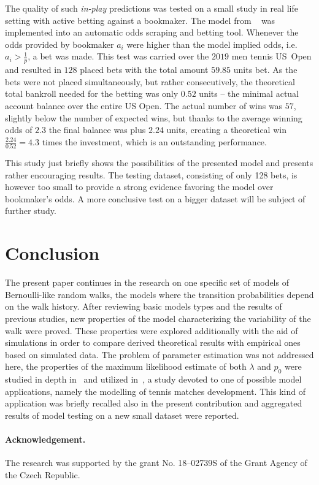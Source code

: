 \documentclass[runningheads]{CMSIM}
\begin{document}
    The quality of such \emph{in-play} predictions was tested on a small study in real life setting with active betting against a bookmaker.
    The model from ~\cite{ja2019mathsport_proc} was implemented into an automatic odds scraping and betting tool.
    Whenever the odds provided by bookmaker $a_{i}$  were higher than the model implied odds, i.e. $a_{i}>\frac{1}{p}$, a bet was made.
    This test was carried over the $2019$ men tennis US~Open and resulted in $128$ placed bets with the total amount $59.85$ units bet.
    As the bets were not placed simultaneously, but rather consecutively, the theoretical total bankroll needed for the betting was only $0.52$ units -- the minimal actual account balance over the entire US Open.
    The actual number of wins was $57$, slightly below the number of expected wins, but thanks to the average winning odds of $2.3$ the final balance was plus $2.24$ units,
    creating a theoretical win $\frac{2.24}{0.52}=4.3$ times the investment, which is an outstanding performance.

    This study just briefly shows the possibilities of the presented model and presents rather encouraging results.
    The testing dataset, consisting of only 128 bets, is however too small to provide a strong evidence favoring the model over bookmaker's odds.
    A more conclusive test on a bigger dataset will be subject of further study.


    \section{Conclusion}\label{sec:conclusion}

    The present paper continues in the research on one specific set of
    models of Bernoulli-like random walks, the models where the transition
    probabilities depend on the walk history.
    After reviewing basic models
    types and the results of previous studies, new
    properties of the model characterizing the variability of the walk were proved.
    These properties were explored additionally with the aid
    of simulations in order to compare derived theoretical results with
    empirical ones based on simulated data.
    The problem of parameter
    estimation was not addressed here, the properties of the maximum likelihood
    estimate of both $\lambda$ and $p_{0}$ were studied in depth in~\cite{ja2019apmat} and utilized in~\cite{ja2019mathsport_proc},
    a study devoted to one of possible model applications, namely the
    modelling of tennis matches development.
    This kind of application was briefly recalled also in the present contribution and aggregated results of model testing on a new small dataset were reported.

    \paragraph{Acknowledgement.}
    The research was supported by the grant No. 18--02739S of the Grant Agency of the Czech Republic.


    
    
\end{document}
